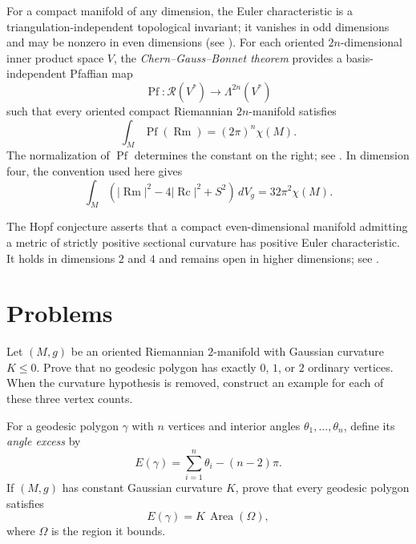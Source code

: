 For a compact manifold of any dimension, the Euler characteristic is a
triangulation-independent topological invariant; it vanishes in odd dimensions
and may be nonzero in even dimensions (see \cite[Thm. 13.36]{LeeTM}). For each
oriented $2n$-dimensional inner product space $V$, the
\emph{Chern--Gauss--Bonnet theorem} provides a basis-independent Pfaffian map
\[
\operatorname{Pf}\colon\mathcal R(V^*)\longrightarrow\Lambda^{2n}(V^*)
\]
such that every oriented compact Riemannian $2n$-manifold satisfies
\[
\int_M\operatorname{Pf}(\operatorname{Rm})=(2\pi)^n\chi(M).
\]
The normalization of $\operatorname{Pf}$ determines the constant on the right;
see \cite[Vol. 5]{Spi79}. In dimension four, the convention used here gives
\begin{equation}
\int_M\left(
|\operatorname{Rm}|^2-4|\operatorname{Rc}|^2+S^2
\right)\,dV_g
=32\pi^2\chi(M).
\label{eq:chern-gauss-bonnet-4d}
\tag{9.14}
\end{equation}

The Hopf conjecture asserts that a compact even-dimensional manifold admitting
a metric of strictly positive sectional curvature has positive Euler
characteristic. It holds in dimensions $2$ and $4$ and remains open in higher
dimensions; see \cite[p. 320]{Pet16}.
\section{Problems}

\begin{exercise}
\label{prob:geodesic-polygons-negative-curvature}

Let $(M,g)$ be an oriented Riemannian $2$-manifold with Gaussian curvature
$K\leq0$. Prove that no geodesic polygon has exactly $0$, $1$, or $2$
ordinary vertices. When the curvature hypothesis is removed, construct an
example for each of these three vertex counts.
\end{exercise}

\begin{exercise}
\label{prob:angle-excess-formula}

For a geodesic polygon $\gamma$ with $n$ vertices and interior angles
$\theta_1,\ldots,\theta_n$, define its \emph{angle excess} by
\[
E(\gamma)=\sum_{i=1}^n\theta_i-(n-2)\pi.
\]
If $(M,g)$ has constant Gaussian curvature $K$, prove that every geodesic
polygon satisfies
\[
E(\gamma)=K\,\operatorname{Area}(\Omega),
\]
where $\Omega$ is the region it bounds.
\end{exercise}


